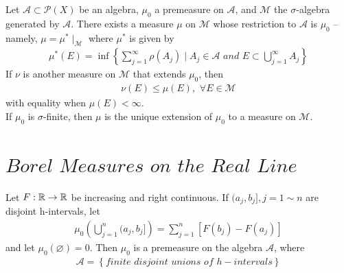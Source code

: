 	\newpage
	
	\begin{thm}\label{thm 2.4.2}
		Let $\mathcal{A} \subset \mathcal{P}(X)$ be an algebra, $\mu_0$ a premeasure on $\mathcal{A}$, and $\mathcal{M}$ the $\sigma$-algebra generated by $\mathcal{A}$. There exists a measure $\mu$ on $\mathcal{M}$ whose restriction to $\mathcal{A}$ is $\mu_0$ -- namely, $\mu = \mu^{*} \mid_{\mathcal{M}}$ where $\mu^{*}$ is given by 
		\begin{align}
			\mu^{*}(E) = \inf{\left\{ \sum_{j = 1}^{\infty}{\rho(A_j)} \mid A_j \in \mathcal{A} \,\, and \,\, E \subset \bigcup_{j = 1}^{\infty}{A_j} \right\}}
		\end{align}
		If $\nu$ is another measure on $\mathcal{M}$ that extends $\mu_0$, then
		\begin{align}
			\nu(E) \leq \mu(E) , \,\, \forall E \in \mathcal{M}
		\end{align}
		with equality when $\mu(E) < \infty$.\\
		If $\mu_0$ is $\sigma$-finite, then $\mu$ is the unique extension of $\mu_0$ to a measure on $\mathcal{M}$.
	\end{thm}

\newpage

\section{$Borel \,\, Measures \,\, on \,\, the \,\, Real \,\, Line$}
	\begin{proposition}\label{prop 2.5.1}
		Let $F : \mathbb{R} \rightarrow \mathbb{R}$ be increasing and right continuous. If $(a_j , b_j] , j = 1 \sim n$ are disjoint h-intervals, let
		\begin{align}
			\mu_0(\bigcup_{j = 1}^{n}{(a_j , b_j]}) = \sum_{j = 1}^{n}{\left[ F(b_j) - F(a_j) \right]}
		\end{align}
		and let $\mu_0(\varnothing) = 0$. Then $\mu_0$ is a premeasure on the algebra $\mathcal{A}$, where
		\begin{align}
			\mathcal{A} = \left\{ finite \,\, disjoint \,\, unions \,\, of \,\, h-intervals \right\}
		\end{align}
	\end{proposition}
	
	\vspace*{16em}
	
